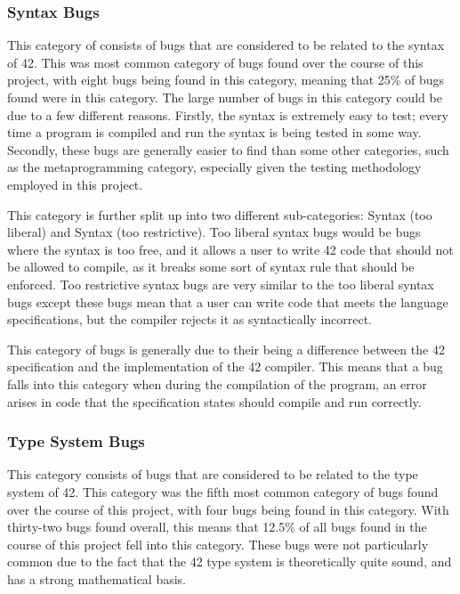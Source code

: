 \subsubsection{Syntax Bugs}

This category of consists of bugs that are considered to be related to the syntax of 42. This was most common category of bugs found over the course of this project, with eight bugs being found in this category, meaning that 25\% of bugs found were in this category. The large number of bugs in this category could be due to a few different reasons. Firstly, the syntax is extremely easy to test; every time a program is compiled and run the syntax is being tested in some way. Secondly, these bugs are generally easier to find than some other categories, such as the metaprogramming category, especially given the testing methodology employed in this project. 

This category is further split up into two different sub-categories: Syntax (too liberal) and Syntax (too restrictive). Too liberal syntax bugs would be bugs where the syntax is too free, and it allows a user to write 42 code that should not be allowed to compile, as it breaks some sort of syntax rule that should be enforced. Too restrictive syntax bugs are very similar to the too liberal syntax bugs except these bugs mean that a user can write code that meets the language specifications, but the compiler rejects it as syntactically incorrect. 

This category of bugs is generally due to their being a difference between the 42 specification and the implementation of the 42 compiler. This means that a bug falls into this category when during the compilation of the program, an error arises in code that the specification states should compile and run correctly.

\subsubsection{Type System Bugs}

This category consists of bugs that are considered to be related to the type system of 42. This category was the fifth most common category of bugs found over the course of this project, with four bugs being found in this category. With thirty-two bugs found overall, this means that 12.5\% of all bugs found in the course of this project fell into this category. These bugs were not particularly common due to the fact that the 42 type system is theoretically quite sound, and has a strong mathematical basis. 

